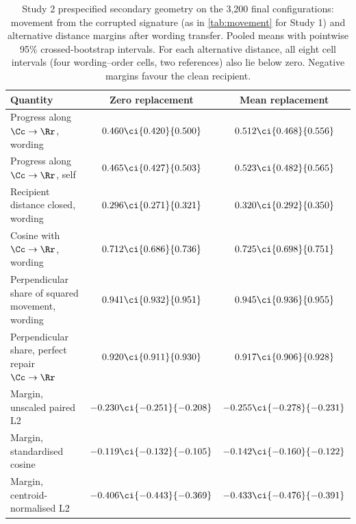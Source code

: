 \begin{table}[htbp]
\centering\small
\caption{Study 2 prespecified secondary geometry on the 3,200 final configurations: movement from the corrupted signature (as in \cref{tab:movement} for Study 1) and alternative distance margins after wording transfer. Pooled means with pointwise 95\% crossed-bootstrap intervals. For each alternative distance, all eight cell intervals (four wording--order cells, two references) also lie below zero. Negative margins favour the clean recipient.}
\label{tab:confirmation-secondary-geometry}
\begin{tabular}{@{}lcc@{}}
\toprule
Quantity & Zero replacement & Mean replacement \\
\midrule
Progress along $\Cc \to \Rr$, wording & $0.460\ci{0.420}{0.500}$ & $0.512\ci{0.468}{0.556}$ \\
Progress along $\Cc \to \Rr$, self & $0.465\ci{0.427}{0.503}$ & $0.523\ci{0.482}{0.565}$ \\
Recipient distance closed, wording & $0.296\ci{0.271}{0.321}$ & $0.320\ci{0.292}{0.350}$ \\
Cosine with $\Cc \to \Rr$, wording & $0.712\ci{0.686}{0.736}$ & $0.725\ci{0.698}{0.751}$ \\
Perpendicular share of squared movement, wording & $0.941\ci{0.932}{0.951}$ & $0.945\ci{0.936}{0.955}$ \\
Perpendicular share, perfect repair $\Cc \to \Rr$ & $0.920\ci{0.911}{0.930}$ & $0.917\ci{0.906}{0.928}$ \\
\midrule
Margin, unscaled paired L2 & $-0.230\ci{-0.251}{-0.208}$ & $-0.255\ci{-0.278}{-0.231}$ \\
Margin, standardised cosine & $-0.119\ci{-0.132}{-0.105}$ & $-0.142\ci{-0.160}{-0.122}$ \\
Margin, centroid-normalised L2 & $-0.406\ci{-0.443}{-0.369}$ & $-0.433\ci{-0.476}{-0.391}$ \\
\bottomrule
\end{tabular}
\end{table}
